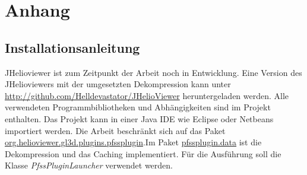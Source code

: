 \section{Anhang}
\subsection{Installationsanleitung}
JHelioviewer ist zum Zeitpunkt der Arbeit noch in Entwicklung. Eine Version des JHelioviewers mit der umgesetzten Dekompression kann unter \url{http://github.com/Helldevastator/JHelioViewer} heruntergeladen werden. Alle verwendeten Programmbibliotheken und Abhängigkeiten sind im Projekt enthalten. Das Projekt kann in einer Java IDE wie Eclipse oder Netbeans importiert werden. Die Arbeit beschränkt sich auf das Paket \url{org.helioviewer.gl3d.plugins.pfssplugin}.Im Paket \url{pfssplugin.data} ist die Dekompression und das Caching implementiert. Für die Ausführung soll die Klasse \textit{PfssPluginLauncher} verwendet werden.

